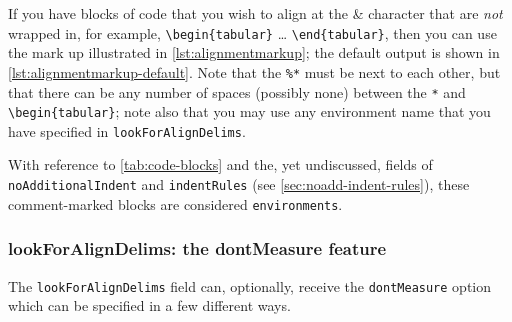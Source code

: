 \documentclass[10pt]{article}
\begin{document}
 If you have blocks of code that you wish to align at the \& character that are
 \emph{not} wrapped in, for example, \lstinline!\begin{tabular}! \ldots
 \lstinline!\end{tabular}!, then you can use the mark up illustrated in
 \cref{lst:alignmentmarkup}; the default output is shown in
 \cref{lst:alignmentmarkup-default}. Note that the \lstinline!%*! must be next to each
 other, but that there can be any number of spaces (possibly none) between the
 \lstinline!*! and \lstinline!\begin{tabular}!; note also that you may use any
 environment name that you have specified in \texttt{lookForAlignDelims}.

 \begin{cmhtcbraster}[raster left skip=-1.5cm,]
 \end{cmhtcbraster}

 With reference to \vref{tab:code-blocks} and the, yet undiscussed, fields of
 \texttt{noAdditionalIndent} and \texttt{indentRules} (see
 \vref{sec:noadd-indent-rules}), these comment-marked blocks are considered
 \texttt{environments}.

\subsubsection{lookForAlignDelims: the dontMeasure feature}\label{sec:dontMeasure}
 The  \texttt{lookForAlignDelims} field can,
 optionally, receive the \texttt{dontMeasure} option which can be specified in a few
 different ways.
\end{document}

